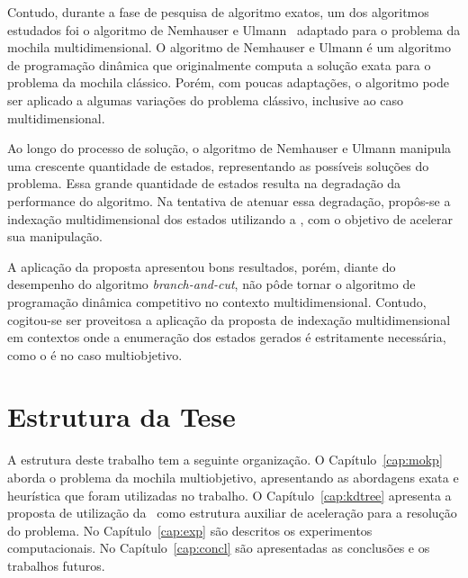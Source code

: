 Contudo, durante a fase de pesquisa de algoritmo exatos, um dos algoritmos estudados
foi o algoritmo de Nemhauser e Ulmann~\cite{nemhauser1969discrete}
adaptado para o problema da mochila multidimensional.
O algoritmo de Nemhauser e Ulmann é um algoritmo de programação dinâmica que originalmente
computa a solução exata para o problema da mochila clássico.
Porém, com poucas adaptações, o algoritmo pode ser aplicado a algumas variações do problema clássivo, inclusive ao caso multidimensional.

Ao longo do processo de solução, o algoritmo de Nemhauser e Ulmann
manipula uma crescente quantidade de estados,
representando as possíveis soluções do problema.
Essa grande quantidade de estados resulta na degradação da performance do algoritmo.
Na tentativa de atenuar essa degradação, propôs-se a indexação multidimensional
dos estados utilizando a \kdtree{}, com o objetivo de acelerar sua manipulação.

A aplicação da proposta apresentou bons resultados, porém, diante do
desempenho do algoritmo \emph{branch-and-cut}, não pôde tornar o
algoritmo de programação dinâmica competitivo no contexto multidimensional.
Contudo, cogitou-se ser proveitosa a aplicação da proposta de indexação multidimensional
em contextos onde a enumeração dos estados gerados é estritamente necessária,
como o é no caso multiobjetivo.


\section{Estrutura da Tese}

A estrutura deste trabalho tem a seguinte organização.
O Capítulo~\ref{cap:mokp} aborda o problema da mochila multiobjetivo,
apresentando as abordagens exata e heurística que foram utilizadas no trabalho.
O Capítulo~\ref{cap:kdtree} apresenta a proposta de utilização da \kdtree\ como
estrutura auxiliar de aceleração para a resolução do problema.
No Capítulo~\ref{cap:exp} são descritos os experimentos computacionais.
No Capítulo~\ref{cap:concl} são apresentadas as conclusões e os  trabalhos futuros.



